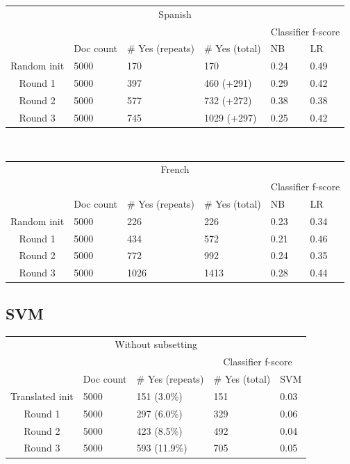 \documentclass[11pt]{article} %
\begin{document}
\begin{tabular}{|c|l|l|l|l|l|}
\multicolumn{6}{|c|}{Spanish} \\
\rowcolor{gray!50} &&&& \multicolumn{2}{|c|}{Classifier f-score} \\
\rowcolor{gray!50} & Doc count & \# Yes (repeats) & \# Yes (total) & NB & LR \\
Random init & 5000 & 170 & 170 & 0.24 & 0.49 \\
Round 1 & 5000 & 397 & 460 (+291) & 0.29 & 0.42 \\
Round 2 & 5000 & 577 & 732 (+272) & 0.38 & 0.38 \\
Round 3 & 5000 & 745 & 1029 (+297) & 0.25 & 0.42 \\
\end{tabular} \\
\begin{tabular}{|c|l|l|l|l|l|}
\multicolumn{6}{|c|}{French} \\
\rowcolor{gray!50} &&&& \multicolumn{2}{|c|}{Classifier f-score} \\
\rowcolor{gray!50} & Doc count & \# Yes (repeats) & \# Yes (total) & NB & LR \\
Random init & 5000 & 226 & 226 & 0.23 & 0.34 \\
Round 1 & 5000 & 434 & 572 & 0.21 & 0.46 \\
Round 2 & 5000 & 772 & 992 & 0.24 & 0.35 \\
Round 3 & 5000 & 1026 & 1413 & 0.28 & 0.44 \\
\end{tabular}


\subsection{SVM}

\begin{tabular}{|c|l|l|l|l|}
\multicolumn{5}{|c|}{Without subsetting} \\
\rowcolor{gray!50} &&& \multicolumn{2}{|c|}{Classifier f-score} \\
\rowcolor{gray!50} & Doc count & \# Yes (repeats) & \# Yes (total) & SVM \\
Translated init & 5000 & 151 (3.0\%) & 151 & 0.03 \\
Round 1 & 5000 &  297 (6.0\%) & 329 & 0.06 \\
Round 2 & 5000 & 423 (8.5\%) & 492 & 0.04 \\
Round 3 & 5000 & 593 (11.9\%) & 705 & 0.05 \\
\end{tabular} \quad
\end{document}

